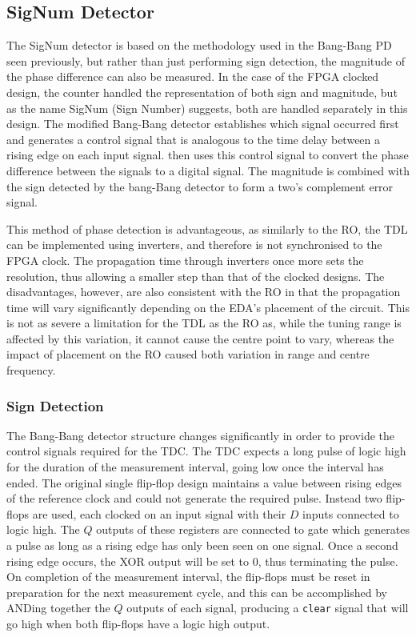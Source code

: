 \subsection{SigNum Detector}\label{section:signum}
The SigNum detector is based on the methodology used in the Bang-Bang \acl{PD} seen previously, but rather than just performing sign detection, the magnitude of the phase difference can also be measured. In the case of the \ac{FPGA} clocked design, the counter handled the representation of both sign and magnitude, but as the name SigNum (Sign Number) suggests, both are handled separately in this design. The modified Bang-Bang detector establishes which signal occurred first and generates a control signal that is analogous to the time delay between a rising edge on each input signal.  then uses this control signal to convert the phase difference between the signals to a digital signal. The magnitude is combined with the sign detected by the bang-Bang detector to form a two's complement error signal.

This method of phase detection is advantageous, as similarly to the \acl{RO}, the \ac{TDL} can be implemented using inverters, and therefore is not synchronised to the \ac{FPGA} clock. The propagation time through inverters once more sets the resolution, thus allowing a smaller step than that of the clocked designs. The disadvantages, however, are also consistent with the \ac{RO} in that the propagation time will vary significantly depending on the \ac{EDA}'s placement of the circuit. This is not as severe a limitation for the \ac{TDL} as the \ac{RO} as, while the tuning range is affected by this variation, it cannot cause the centre point to vary, whereas the impact of placement on the \ac{RO} caused both variation in range and centre frequency.


\subsubsection{Sign Detection}
The Bang-Bang detector structure changes significantly in order to provide the control signals required for the \ac{TDC}. The \ac{TDC} expects a long pulse of logic high for the duration of the measurement interval, going low once the interval has ended. The original single flip-flop design maintains a value between rising edges of the reference clock and could not generate the required pulse. Instead two flip-flops are used, each clocked on an input signal with their $D$ inputs connected to logic high. The $Q$ outputs of these registers are connected to  gate which generates a pulse as long as a rising edge has only been seen on one signal. Once a second rising edge occurs, the \acs{XOR} output will be set to 0, thus terminating the pulse. On completion of the measurement interval, the flip-flops must be reset in preparation for the next measurement cycle, and this can be accomplished by ANDing together the $Q$ outputs of each signal, producing a \texttt{clear} signal that will go high when both flip-flops have a logic high output.

